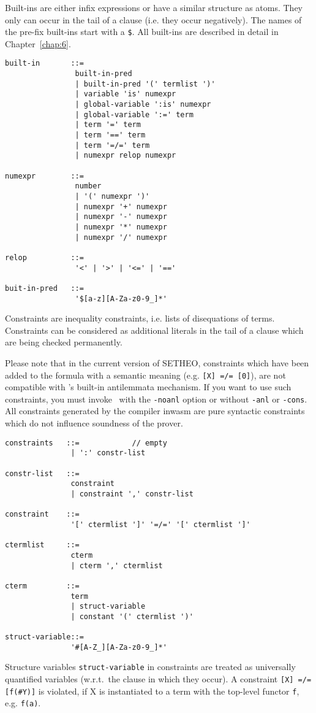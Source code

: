 Built-ins are either infix expressions or have a similar
structure as atoms. They only can occur in the tail of
a clause (i.e. they occur negatively).
The names of the pre-fix built-ins
start with a {\tt \$}. All built-ins are described
in detail in Chapter~\ref{chap:6}.

\begin{verbatim}
built-in       ::=
                built-in-pred
                | built-in-pred '(' termlist ')'
                | variable 'is' numexpr
                | global-variable ':is' numexpr
                | global-variable ':=' term
                | term '=' term
                | term '==' term
                | term '=/=' term
                | numexpr relop numexpr

numexpr        ::=
                number
                | '(' numexpr ')'
                | numexpr '+' numexpr
                | numexpr '-' numexpr
                | numexpr '*' numexpr
                | numexpr '/' numexpr

relop          ::=
                '<' | '>' | '<=' | '=='

buit-in-pred   ::=
                '$[a-z][A-Za-z0-9_]*'
\end{verbatim}

Constraints are inequality constraints, i.e. lists of
disequations of terms.
Constraints can be considered as additional literals in the tail
of a clause which are being checked permanently.

Please note that in the current version of SETHEO, constraints
which have been added to the formula with a semantic meaning
(e.g. {\tt [X] =/= [0]}), are not compatible with \SAM's built-in
antilemmata mechanism. 
If you want to use such constraints, you must
invoke \SAM\ with the {\tt -noanl} option
or without {\tt -anl} or {\tt -cons}.
All constraints generated by the compiler inwasm are pure syntactic
constraints which do not influence soundness of the prover.


\begin{verbatim}
constraints   ::=            // empty
               | ':' constr-list

constr-list   ::=
               constraint
               | constraint ',' constr-list

constraint    ::=
               '[' ctermlist ']' '=/=' '[' ctermlist ']'

ctermlist     ::=
               cterm
               | cterm ',' ctermlist

cterm         ::=
               term
               | struct-variable
               | constant '(' ctermlist ')'

struct-variable::=
               '#[A-Z_][A-Za-z0-9_]*'
\end{verbatim}

Structure variables {\tt struct-variable} in constraints
are treated as universally quantified variables (w.r.t.\ the clause
in which they occur). A constraint {\tt [X] =/= [f(\#Y)]} is
violated, if X is instantiated to a term with the top-level
functor {\tt f}, e.g. {\tt f(a)}.
